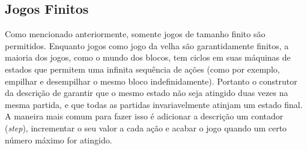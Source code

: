 \subsection{Jogos Finitos}
Como mencionado anteriormente, somente jogos de tamanho finito são permitidos.  Enquanto jogos como jogo da velha são garantidamente finitos, a maioria dos jogos, como o mundo dos blocos, tem ciclos em suas máquinas de estados que permitem uma infinita sequência de ações (como por exemplo, empilhar e desempilhar o mesmo bloco indefinidamente). Portanto o construtor da descrição de garantir que o mesmo estado não seja atingido duas vezes na mesma partida, e que todas as partidas invariavelmente atinjam um estado final. A maneira mais comum para fazer isso é adicionar a descrição um contador (\textit{step}), incrementar o seu valor a cada ação e acabar o jogo quando um certo número máximo for atingido.